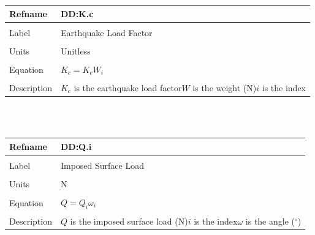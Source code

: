 \documentclass[12pt]{article}
\begin{document}
\noindent \begin{minipage}{\textwidth}
\begin{tabular}{p{} p{}}
\toprule \textbf{Refname} & \textbf{DD:K.c}
\label{DD:K.c}
\\ \midrule \\
Label & Earthquake Load Factor
\\ \midrule \\
Units & Unitless
\\ \midrule \\
Equation & ${K_{c}}={K_{c}} W_{i}$
\\ \midrule \\
Description & ${K_{c}}$ is the earthquake load factor\newline$W$ is the weight (N)\newline$i$ is the index
\\ \bottomrule \end{tabular}
\end{minipage}\\
~\newline
\noindent \begin{minipage}{\textwidth}
\begin{tabular}{p{} p{}}
\toprule \textbf{Refname} & \textbf{DD:Q.i}
\label{DD:Q.i}
\\ \midrule \\
Label & Imposed Surface Load
\\ \midrule \\
Units & N
\\ \midrule \\
Equation & $Q=Q_{i} ω_{i}$
\\ \midrule \\
Description & $Q$ is the imposed surface load (N)\newline$i$ is the index\newline$ω$ is the angle (${}^{\circ}$)
\\ \bottomrule \end{tabular}
\end{minipage}\\
~\newline
\end{document}

